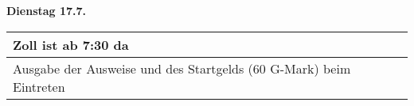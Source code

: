 \documentclass[12pt]{article}
\begin{document}
\textbf{Dienstag 17.7.}
\vspace{5mm}

\begin{tabular}{|p{15cm}|p{3cm}|}
    \hline
    Zoll ist ab 7:30 da                                                & \\ \hline
    Ausgabe der Ausweise und des Startgelds (60 G-Mark) beim Eintreten & \\ \hline
\end{tabular}
\end{document}

